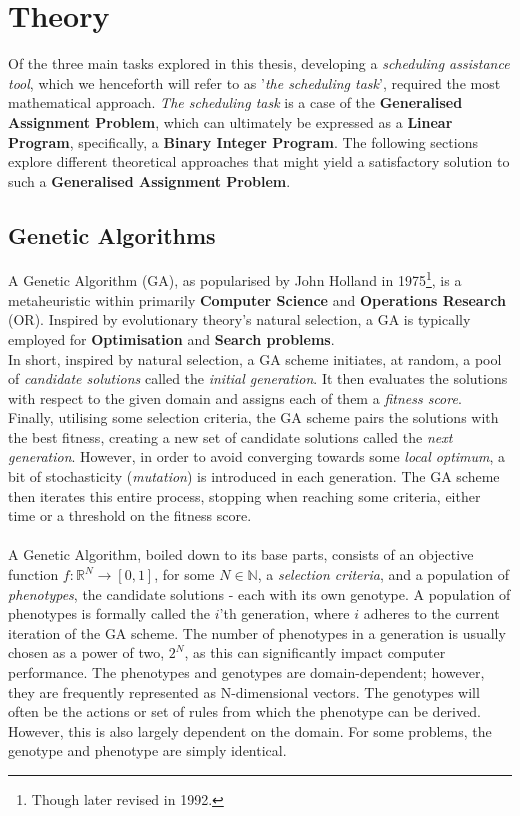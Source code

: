 \section{Theory}
Of the three main tasks explored in this thesis, developing a \textit{scheduling assistance tool}, which we henceforth will refer to as '\textit{the scheduling task}', required the most mathematical approach. \textit{The scheduling task} is a case of the \textbf{Generalised Assignment Problem}\cite{Wiki-general-assignment-prob}, which can ultimately be expressed as a \textbf{Linear Program}\cite{Wiki-linear-programming}, specifically, a \textbf{Binary Integer Program}.
The following sections explore different theoretical approaches that might yield a satisfactory solution to such a \textbf{Generalised Assignment Problem}.

\subsection{Genetic Algorithms}
A Genetic Algorithm (GA), as popularised by John Holland\cite{Genetic-Algorithm-original} in 1975\footnote{Though later revised in 1992.}, is a metaheuristic within primarily \textbf{Computer Science} and \textbf{Operations Research} (OR). Inspired by evolutionary theory's natural selection, a GA is typically employed for \textbf{Optimisation} and \textbf{Search problems}.
\\
In short, inspired by natural selection, a GA scheme initiates, at random, a pool of \textit{candidate solutions} called the \textit{initial generation}. It then evaluates the solutions with respect to the given domain and assigns each of them a \textit{fitness score}. Finally, utilising some selection criteria, the GA scheme pairs the solutions with the best fitness, creating a new set of candidate solutions called the \textit{next generation}. However, in order to avoid converging towards some \textit{local optimum}, a bit of stochasticity (\textit{mutation}) is introduced in each generation. The GA scheme then iterates this entire process, stopping when reaching some criteria, either time or a threshold on the fitness score.
\\
\\
A Genetic Algorithm, boiled down to its base parts, consists of an objective function $f : \mathbb{R}^N \rightarrow [0,1]$, for some $N \in \mathbb{N}$, a \textit{selection criteria}, and a population of \textit{phenotypes}, the candidate solutions - each with its own genotype. A population of phenotypes is formally called the $i$'th generation, where $i$ adheres to the current iteration of the GA scheme. The number of phenotypes in a generation is usually chosen as a power of two, $2^N$, as this can significantly impact computer performance. The phenotypes and genotypes are domain-dependent; however, they are frequently represented as N-dimensional vectors. The genotypes will often be the actions or set of rules from which the phenotype can be derived. However, this is also largely dependent on the domain. For some problems, the genotype and phenotype are simply identical.
